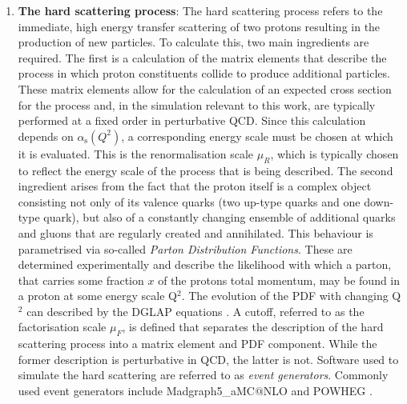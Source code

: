 \begin{enumerate}
    \item \textbf{The hard scattering process}: The hard scattering process refers to the immediate, high energy transfer scattering of two protons resulting in the production of new particles. To calculate this, two main ingredients are required. The first is a calculation of the matrix elements that describe the process in which proton constituents collide to produce additional particles. These matrix elements allow for the calculation of an expected cross section for the process and, in the simulation relevant to this work, are typically performed at a fixed order in perturbative QCD. Since this calculation depends on $\alpha_{\mathrm{s}}(Q^2)$, a corresponding energy scale must be chosen at which it is evaluated. This is the renormalisation scale $\mu_R$, which is typically chosen to reflect the energy scale of the process that is being described. The second ingredient arises from the fact that the proton itself is a complex object consisting not only of its valence quarks (two up-type quarks and one down-type quark), but also of a constantly changing ensemble of additional quarks and gluons that are regularly created and annihilated. This behaviour is parametrised via so-called \textit{Parton Distribution Functions}. These are determined experimentally \cite{PDFDIS} and describe the likelihood with which a parton, that carries some fraction $x$ of the protons total momentum, may be found in a proton at some energy scale Q$^2$. The evolution of the PDF with changing Q$^2$ can described by the DGLAP equations \cite{DGLAP}. A cutoff, referred to as the factorisation scale $\mu_F$, is defined that separates the description of the hard scattering process into a matrix element and PDF component. While the former description is perturbative in QCD, the latter is not. Software used to simulate the hard scattering are referred to as \textit{event generators}. Commonly used event generators include \textsf{Madgraph5\_aMC$@$NLO} \cite{MadGraph} and \textsf{POWHEG} \cite{POWHEG}. 

\end{enumerate}
